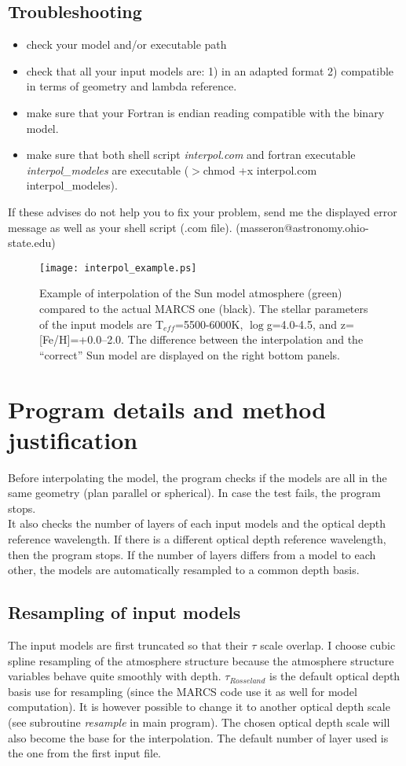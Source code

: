 \documentclass[11pt]{article}
\begin{document}
\subsection{Troubleshooting}
\begin{itemize}
\item check your model and/or executable path
\item check that all your input models are: 1) in an adapted format 2) compatible in terms of geometry and lambda reference. 
\item make sure that your Fortran is endian reading compatible with the binary model. 
\item make sure that both shell script \textit{interpol.com} and fortran executable \textit{interpol\_modeles} are executable ($>$chmod +x interpol.com interpol\_modeles).
\end{itemize}
If these advises do not help you to fix your problem, send me the displayed error message as well as your shell script (.com file). 
(masseron@astronomy.ohio-state.edu)

\begin{figure}[h!]
\begin{center}
\texttt{[image: interpol\_example.ps]}
 \caption{ Example of interpolation of the Sun model atmosphere (green) compared to the actual MARCS one (black). The stellar parameters of the input models are T$_{eff}$=5500-6000K, $\log$g=4.0-4.5, and z=[Fe/H]=+0.0--2.0. The difference between the interpolation and the ``correct'' Sun model are displayed on the right bottom panels. }
\label{fig:example}
\end{center}
\end{figure}

\section{Program details and method justification}
Before interpolating the model, the program checks if the models are all in the same geometry (plan parallel or spherical). In case the test fails, the program stops.\\ 
It also checks the number of layers of each input models and the optical depth reference wavelength.
If there is a different optical depth reference wavelength, then the program stops. If the number of layers differs from a model to each other, the models are automatically resampled to a common depth basis. 

\subsection{Resampling of input models}
The input models are first truncated so that their $\tau$ scale overlap. I choose cubic spline resampling of the atmosphere structure  because the atmosphere structure variables behave quite smoothly with depth.
$\tau_{Rosseland}$ is the default optical depth basis use for resampling (since the MARCS code use it as well for model computation). It is however possible to change it to another optical depth scale (see subroutine 
\textit{resample} in main program). The chosen optical depth scale will also become the base for the interpolation. The default number of layer used is the one from the first input file.
\end{document}
